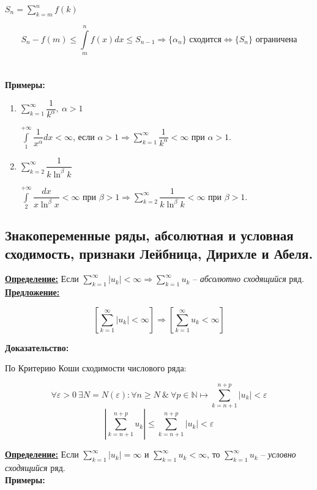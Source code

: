 \documentclass[a4paper,12pt]{article} %
\newcommand{\N}{\mathbb{N}}
\newcommand{\series}{\sum\limits_{k=1}^{\infty}}
\newcommand{\useries}{\sum\limits_{k=1}^{\infty} u_k}
\newcommand{\useriesl}{\sum\limits_{k=1}^{\infty} u_k < \infty}
\newcommand{\auseriesl}{\sum\limits_{k=1}^{\infty} |u_k| < \infty}
\newcommand{\auseriese}{\sum\limits_{k=1}^{\infty} |u_k| = \infty}
\begin{document}
$S_n = \sum\limits_{k=m}^{n} f(k)$

\[S_n - f(m) \leqslant \int\limits_{m}^{n} f(x)dx \leqslant S_{n-1} \Rightarrow \{ \alpha_n \} \text{ сходится} \Leftrightarrow \{ S_n \} \text{ ограничена} \]\\\\

\textbf{Примеры:}

\begin{enumerate}
	\item $\series \dfrac{1}{k^{\alpha}}, \ \alpha > 1$
	
	$\int\limits_{1}^{+\infty} \dfrac{1}{x^{\alpha}}dx < \infty$, если $\alpha > 1 \Rightarrow \series \dfrac{1}{k^{\alpha}} < \infty$ при $\alpha > 1$. 
	\item $\sum\limits_{k=2}^{\infty} \dfrac{1}{k \ln^{\beta}k}$
	
	$\int\limits_{2}^{+\infty} \dfrac{dx}{x \ln^{\beta}x} < \infty \text{ при } \beta > 1 \Rightarrow \sum\limits_{k=2}^{\infty}\dfrac{1}{k \ln^{\beta}k} < \infty \text{ при } \beta > 1$. \\
\end{enumerate}

\subsection{Знакопеременные ряды, абсолютная и условная сходимость, признаки Лейбница, Дирихле и Абеля.}

\underline{\textbf{Определение:}}
Если $\auseriesl \Rightarrow \useries$ -- \textit{абсолютно сходящийся} ряд.\\

\underline{\textbf{Предложение:}}

\[ \left[ \auseriesl \right] \Rightarrow \left[ \useriesl \right] \]

\textbf{Доказательство:}

По Критерию Коши сходимости числового ряда:

\[\forall \varepsilon > 0 \ \exists N = N(\varepsilon): \forall n \geqslant N \ \& \ \forall p \in \N \mapsto \sum\limits_{k=n+1}^{n+p} |u_k| < \varepsilon \]
\[\left| \sum\limits_{k=n+1}^{n+p} u_k \right| \leqslant \sum\limits_{k=n+1}^{n+p} |u_k| < \varepsilon\]

\underline{\textbf{Определение:}}
Если $\auseriese$ и $\useriesl$, то $\useries$ -- \textit{условно сходящийся} ряд.\\

\textbf{Примеры:}
\end{document}
